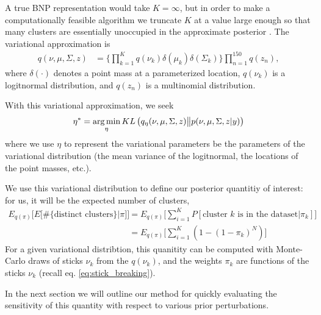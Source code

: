 %
A true BNP representation would take $K = \infty$, but in order to make a
computationally feasible algorithm we truncate $K$ at a value large enough so
that many clusters are essentially unoccupied in the approximate posterior
\citep{blei:2006:dirichletbnp}. The variational approximation is
%
\begin{align}
q(\nu, \mu, \Sigma, z) & =
\Big\{\prod_{k=1}^{K}q\left(\nu_{k}\right)\delta\left(\mu_{k}\right)
    \delta\left(\Sigma_{k}\right)\Big\} \prod_{n=1}^{150}q\left(z_{n}\right),
\end{align}
%
where $\delta\left(\cdot\right)$ denotes a point mass at a parameterized
location, $q\left(\nu_{k}\right)$ is a logitnormal distribution, and
$q\left(z_{n}\right)$ is a multinomial distribution.

With this variational approximation, we seek
%
\begin{align}
\eta^* = \operatorname*{arg\,min}_{\eta} KL\left(
    q_\eta(\nu, \mu, \Sigma, z) \big\| p(\nu, \mu, \Sigma, z | y)
    \right) \label{eq:kl_objective}
\end{align}
%
where we use $\eta$ to represent the variational parameters be the parameters of
the variational distribution (the mean variance of the logitnormal, the
locations of the point masses, etc.).

We use this variational distribution to define our posterior quantitiy of
interest: for us, it will be the expected number of clusters,
%
\begin{align}
  E_{q(\pi)}\Big[E\Big[\#\{\text{distinct clusters}\}|\pi\Big]\Big] &=
  E_{q(\pi)}\Big[\sum_{i=1}^K P[\text{cluster $k$ is in the dataset}|\pi_k]\Big] \\
    &= E_{q(\pi)} \Big[\sum_{i=1}^K (1 - (1 - \pi_k)^N)\Big]
    \label{eq:expected_num_clusters}
\end{align}
%
For a given variational distribtion, this quanitity can be computed with
Monte-Carlo draws of sticks $\nu_k$ from the $q(\nu_k)$, and the weights $\pi_k$
are functions of the sticks $\nu_k$ (recall eq. \ref{eq:stick_breaking}).

In the next section we will outline our method for quickly evaluating the
sensitivity of this quantity with respect to various prior perturbations.

